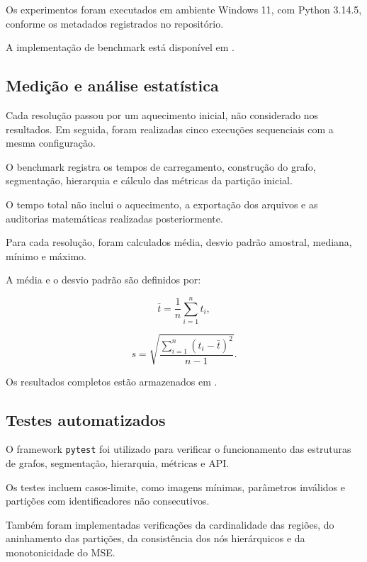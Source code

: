 \documentclass[12pt]{article}
\begin{document}
Os experimentos foram executados em ambiente
Windows 11, com Python 3.14.5, conforme os
metadados registrados no repositório.

A implementação de benchmark está disponível
em .

\subsection{Medição e análise estatística}

Cada resolução passou por um aquecimento
inicial, não considerado nos resultados.
Em seguida, foram realizadas cinco execuções
sequenciais com a mesma configuração.

O benchmark registra os tempos de carregamento,
construção do grafo, segmentação, hierarquia
e cálculo das métricas da partição inicial.

O tempo total não inclui o aquecimento,
a exportação dos arquivos e as auditorias
matemáticas realizadas posteriormente.

Para cada resolução, foram calculados
média, desvio padrão amostral, mediana,
mínimo e máximo.

A média e o desvio padrão são definidos por:

\begin{equation}
\bar{t}=\frac{1}{n}\sum_{i=1}^{n}t_i,
\end{equation}

\begin{equation}
s=\sqrt{
\frac{\sum_{i=1}^{n}(t_i-\bar{t})^2}{n-1}
}.
\end{equation}

Os resultados completos estão armazenados em
.

\subsection{Testes automatizados}

O framework \texttt{pytest} foi utilizado
para verificar o funcionamento das estruturas
de grafos, segmentação, hierarquia,
métricas e API.

Os testes incluem casos-limite, como imagens
mínimas, parâmetros inválidos e partições
com identificadores não consecutivos.

Também foram implementadas verificações
da cardinalidade das regiões, do aninhamento
das partições, da consistência dos nós
hierárquicos e da monotonicidade do MSE.
\end{document}
